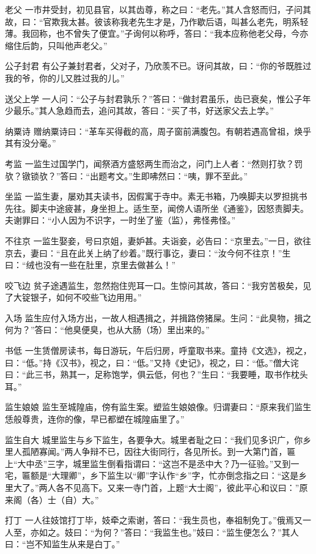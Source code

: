 \documentclass[12pt,UTF8]{ctexbook}
\begin{document}
老父
一市井受封，初见县官，以其齿尊，称之曰：“老先。”其人含怒而归，子问其故，曰：“官欺我太甚。彼该称我老先生才是，乃作歇后语，叫甚么老先，明系轻薄。我回称，也不曾失了便宜。”子询何以称呼，答曰：“我本应称他老父母，今亦缩住后韵，只叫他声老父。”

公子封君
有公子兼封君者，父对子，乃欣羡不已。讶问其故，曰：“你的爷既胜过我的爷，你的儿又胜过我的儿。”

送父上学
一人问：“公子与封君孰乐？”答曰：“做封君虽乐，齿已衰矣，惟公子年少最乐。”其人急趋而去，追问其故，答曰：“买了书，好送家父去上学。”

纳粟诗
赠纳粟诗曰：“革车买得截的高，周子窗前满腹包。有朝若遇高曾祖，焕乎其有没分毫。”

考监
一监生过国学门，闻祭酒方盛怒两生而治之，问门上人者：“然则打欤？罚欤？镦锁欤？”答曰：“出题考文。”生即咈然曰：“咦，罪不至此。”

坐监
一监生妻，屡劝其夫读书，因假寓于寺中。素无书箱，乃唤脚夫以罗担挑书先往。脚夫中途疲甚，身坐担上。适生至，闻傍人语所坐《通鉴》，因怒责脚夫。夫谢罪曰：“小人因为不识字，一时坐了鉴（监），弗怪弗怪。”

不往京
一监生娶妾，号曰京姐，妻妒甚。夫诣妾，必告曰：“京里去。”一日，欲往京去，妻曰：“且在此关上纳了纱着。”既行事讫，妻曰：“汝今何不往京！”生曰：“绒也没有一些在肚里，京里去做甚么！”

咬飞边
贫子途遇监生，忽然抱住兜耳一口。生惊问其故，答曰：“我穷苦极矣，见了大锭银子，如何不咬些飞边用用。”

入场
监生应付入场方出，一故人相遇揖之，并揖路傍猪屎。生问：“此臭物，揖之何为？”答曰：“他臭便臭，也从大肠（场）里出来的。”

书低
一生赁僧房读书，每日游玩，午后归房，呼童取书来。童持《文选》，视之，曰：“低。”持《汉书》，视之，曰：“低。”又持《史记》，视之，曰：“低。”僧大诧曰：“此三书，熟其一，足称饱学，俱云低，何也？”生曰：“我要睡，取书作枕头耳。”

监生娘娘
监生至城隍庙，傍有监生案。塑监生娘娘像。归谓妻曰：“原来我们监生恁般尊贵，连你的像，早已都塑在城隍庙里了。”

监生自大
城里监生与乡下监生，各要争大。城里者耻之曰：“我们见多识广，你乡里人孤陋寡闻。”两人争辩不已，因往大街同行，各见所长。到一大第门首，匾上“大中丞”三字，城里监生倒看指谓曰：“这岂不是丞中大？乃一征验。”又到一宅，匾额是“大理卿”，乡下监生以“卿”字认作“乡”字，忙亦倒念指之曰：“这是乡里大了。”两人各不见高下。又来一寺门首，上题“大士阁”，彼此平心和议曰：”原来阁（各）士（自）大。”

打丁
一人往妓馆打丁毕，妓牵之索谢，答曰：“我生员也，奉祖制免丁。”俄焉又一人至，亦如之。妓曰：“为何？”答曰：“我监生也。”妓曰：“监生便怎么？”其人曰：“岂不知监生从来是白丁。”
\end{document}
